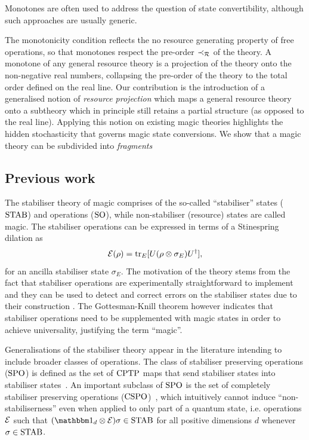 \documentclass[pra,
aps,
twocolumn,
superscriptaddress,
groupedaddress,
nofootinbib,
reprint
]{revtex4-1}
\begin{document}
Monotones are often used to address the question of state convertibility, although such approaches are usually generic.

The monotonicity condition reflects the no resource generating property of free operations, so that monotones respect the pre-order $\prec_{\mathcal{R}}$ of the theory.
A monotone of any general resource theory is a projection of the theory onto the non-negative real numbers, collapsing the pre-order of the theory to the total order defined on the real line.
Our contribution is the introduction of a generalised notion of \emph{resource projection} which maps a general resource theory onto a subtheory which in principle still retains a partial structure (as opposed to the real line).
Applying this notion on existing magic theories highlights the hidden stochasticity that governs magic state conversions.
We show that a magic theory can be subdivided into \emph{fragments} 

\subsection{Previous work}
\label{sec:prev}

The stabiliser theory of magic comprises of the so-called ``stabiliser'' states (${\rm{STAB}}$) and operations (${\rm{SO}}$), while non-stabiliser (resource) states are called magic.
The stabiliser operations can be expressed in terms of a Stinespring dilation as 
\begin{equation}
    \mathcal{E}(\rho) = {\rm{tr}}_E [U(\rho \otimes \sigma_E)U^\dagger],
\end{equation} 
for an ancilla stabiliser state $\sigma_E$. 
The motivation of the theory stems from the fact that stabiliser operations are experimentally straightforward to implement and they can be used to detect and correct errors on the stabiliser states due to their construction \cite{cit:gottesman, cit:gottesman2, cit:gottesman1998}.
The Gottesman-Knill theorem however indicates that stabiliser operations need to be supplemented with magic states in order to achieve universality, justifying the term ``magic''.

Generalisations of the stabiliser theory appear in the literature intending to include broader classes of operations.
The class of stabiliser preserving operations (${\rm{SPO}}$) is defined as the set of ${\rm{CPTP}}$ maps that send stabiliser states into stabiliser states~\cite{cit:ahmadi}.
An important subclass of ${\rm{SPO}}$ is the set of completely stabiliser preserving operations (${\rm{CSPO}}$)~\cite{cit:seddon}, which intuitively cannot induce ``non-stabiliserness'' even when applied to only part of a quantum state, i.e. operations $\mathcal{E}$ such that $(\id_d \otimes \E ) \sigma \in \stab$ for all positive dimensions $d$ whenever $\sigma \in {\rm{STAB}}$.
\end{document}
